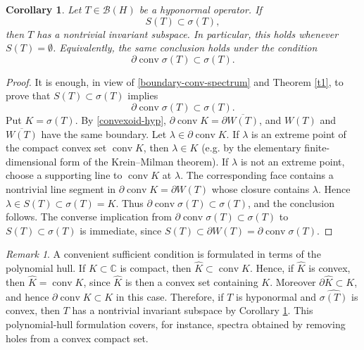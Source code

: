 \documentclass[11pt]{amsart}
\numberwithin{equation}{section}
\newtheorem{corollary}[theorem]{Corollary}
\theoremstyle{definition}
\theoremstyle{remark}
\newtheorem{remark}[theorem]{Remark}
\DeclareMathOperator{\conv}{conv}
\newcommand{\CC}{\mathbb{C}}
\newcommand{\BH}{\mathcal B(H)}
\begin{document}
\begin{corollary}\label{c1}
Let $T\in\BH$ be a hyponormal operator. If
$$
S(T)\subset\sigma(T),
$$
then $T$ has a nontrivial invariant subspace. In particular, this holds whenever $S(T)=\emptyset$.
Equivalently, the same conclusion holds under the condition
$$
\partial\conv\sigma(T)\subset\sigma(T).
$$
\end{corollary}

\begin{proof}
It is enough, in view of \eqref{boundary-conv-spectrum} and Theorem \ref{t1}, to prove that $S(T)\subset\sigma(T)$ implies
$$
\partial\conv\sigma(T)\subset\sigma(T).
$$
Put $K=\sigma(T)$. By \eqref{convexoid-hyp}, $\partial\conv K=\partial\overline{W(T)}$, and $W(T)$ and $\overline{W(T)}$ have the same boundary. Let $\lambda\in\partial\conv K$. If $\lambda$ is an extreme point of the compact convex set $\conv K$, then $\lambda\in K$ (e.g. by the elementary finite-dimensional form of the Krein--Milman theorem). If $\lambda$ is not an extreme point, choose a supporting line to $\conv K$ at $\lambda$. The corresponding face contains a nontrivial line segment in $\partial\conv K=\partial W(T)$ whose closure contains $\lambda$. Hence $\lambda\in S(T)\subset\sigma(T)=K$. Thus $\partial\conv\sigma(T)\subset\sigma(T)$, and the conclusion follows. The converse implication from $\partial\conv\sigma(T)\subset\sigma(T)$ to $S(T)\subset\sigma(T)$ is immediate, since $S(T)\subset\partial W(T)=\partial\conv\sigma(T)$.
\end{proof}


\begin{remark}\label{r-convex-spectrum}
A convenient sufficient condition is formulated in terms of the polynomial
hull. If $K\subset\CC$ is compact, then $\widehat K\subset\conv K$.
Hence, if $\widehat K$ is convex, then $\widehat K=\conv K$, since
$\widehat K$ is then a convex set containing $K$. Moreover
$\partial\widehat K\subset K$, and hence $\partial\conv K\subset K$ in this
case. Therefore, if $T$ is hyponormal and $\widehat{\sigma(T)}$ is convex,
then $T$ has a nontrivial invariant subspace by Corollary \ref{c1}. This
polynomial-hull formulation covers, for instance, spectra obtained by removing
holes from a convex compact set.
\end{remark}
\end{document}
